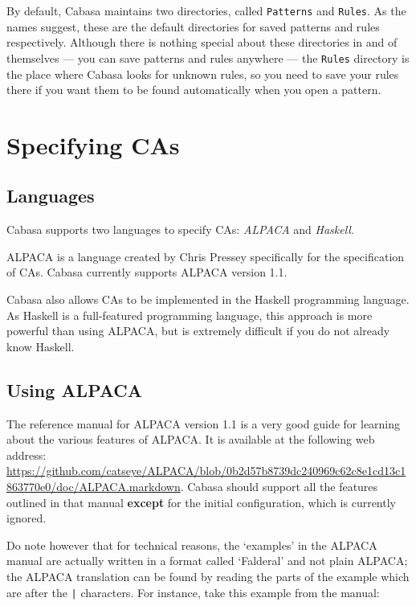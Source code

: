 \documentclass[oneside,a4paper]{memoir}
\begin{document}
By default, Cabasa maintains two directories, called \texttt{Patterns} and \texttt{Rules}.
As the names suggest, these are the default directories for saved patterns and rules respectively.
Although there is nothing special about these directories in and of themselves --- you can save patterns and rules anywhere ---
  the \texttt{Rules} directory is the place where Cabasa looks for unknown rules,
  so you need to save your rules there if you want them to be found automatically when you open a pattern.

\chapter{Specifying CAs}
\label{chap:speccas}

\section{Languages}
\label{sec:speclangs}

Cabasa supports two languages to specify CAs: \emph{ALPACA} and \emph{Haskell}.

ALPACA is a language created by Chris Pressey specifically for the specification of CAs.
Cabasa currently supports ALPACA version 1.1.

Cabasa also allows CAs to be implemented in the Haskell programming language.
As Haskell is a full-featured programming language, this approach is more powerful than using ALPACA,
  but is extremely difficult if you do not already know Haskell.

\section{Using ALPACA}
\label{sec:usalp}

The reference manual for ALPACA version 1.1 is a very good guide for learning about the various features of ALPACA.
It is available at the following web address: \url{https://github.com/catseye/ALPACA/blob/0b2d57b8739dc240969c62c8e1cd13c1863770e0/doc/ALPACA.markdown}.
Cabasa should support all the features outlined in that manual
  \textbf{except} for the initial configuration, which is currently ignored.

Do note however that for technical reasons\footnotemark,
  the `examples' in the ALPACA manual are actually written in a format called `Falderal' and not plain ALPACA;
  the ALPACA translation can be found by reading the parts of the example which are after the \texttt{|} characters.
For instance, take this example from the manual:
\end{document}
